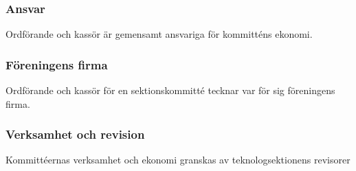 \subsubsection{Ansvar}
Ordförande och kassör är gemensamt ansvariga för kommitténs ekonomi.

\subsubsection{Föreningens firma}
Ordförande och kassör för en sektionskommitté tecknar var för sig
föreningens firma. 

\subsubsection{Verksamhet och revision}
Kommittéernas verksamhet och ekonomi granskas av teknologsektionens revisorer
